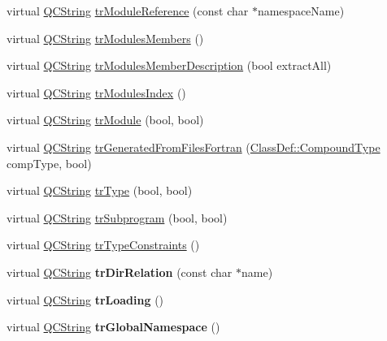 \begin{DoxyCompactItemize}
\item 
virtual \hyperlink{class_q_c_string}{Q\-C\-String} \hyperlink{class_translator_chinese_a5b0385db8ce8e7c8251e31867c6fa8d5}{tr\-Module\-Reference} (const char $\ast$namespace\-Name)
\item 
virtual \hyperlink{class_q_c_string}{Q\-C\-String} \hyperlink{class_translator_chinese_a75279d9914e0cc54ee5f4b15ddaa234c}{tr\-Modules\-Members} ()
\item 
virtual \hyperlink{class_q_c_string}{Q\-C\-String} \hyperlink{class_translator_chinese_a26dd0f47c7f59841f901da7f4bd19306}{tr\-Modules\-Member\-Description} (bool extract\-All)
\item 
virtual \hyperlink{class_q_c_string}{Q\-C\-String} \hyperlink{class_translator_chinese_a8a71cbe9e0669d3555731c3ebc0aae35}{tr\-Modules\-Index} ()
\item 
virtual \hyperlink{class_q_c_string}{Q\-C\-String} \hyperlink{class_translator_chinese_aa864eadd7f41b0282ceae3ebe46c4f51}{tr\-Module} (bool, bool)
\item 
virtual \hyperlink{class_q_c_string}{Q\-C\-String} \hyperlink{class_translator_chinese_ad56ee2b4646b53abea0fd11f17a32fc5}{tr\-Generated\-From\-Files\-Fortran} (\hyperlink{class_class_def_a768a6f0a6fd7e9087ff7971abbcc3f36}{Class\-Def\-::\-Compound\-Type} comp\-Type, bool)
\item 
virtual \hyperlink{class_q_c_string}{Q\-C\-String} \hyperlink{class_translator_chinese_a9052b1bb4e1dd5357873e8c25a51a761}{tr\-Type} (bool, bool)
\item 
virtual \hyperlink{class_q_c_string}{Q\-C\-String} \hyperlink{class_translator_chinese_a9f1bd15801b5d9d28b6030f00da54ee5}{tr\-Subprogram} (bool, bool)
\item 
virtual \hyperlink{class_q_c_string}{Q\-C\-String} \hyperlink{class_translator_chinese_a196f3eb690f2748ee71f518cf02bd7fe}{tr\-Type\-Constraints} ()
\item 
\hypertarget{class_translator_chinese_a38a56cc8bcc5323be9d1f09b0daa5933}{virtual \hyperlink{class_q_c_string}{Q\-C\-String} {\bfseries tr\-Dir\-Relation} (const char $\ast$name)}\label{class_translator_chinese_a38a56cc8bcc5323be9d1f09b0daa5933}

\item 
\hypertarget{class_translator_chinese_aca8cf7409bceb9f8e6af47f637da5457}{virtual \hyperlink{class_q_c_string}{Q\-C\-String} {\bfseries tr\-Loading} ()}\label{class_translator_chinese_aca8cf7409bceb9f8e6af47f637da5457}

\item 
\hypertarget{class_translator_chinese_aa9fd39641e570165be20c71c67481fee}{virtual \hyperlink{class_q_c_string}{Q\-C\-String} {\bfseries tr\-Global\-Namespace} ()}\label{class_translator_chinese_aa9fd39641e570165be20c71c67481fee}


\end{DoxyCompactItemize}
